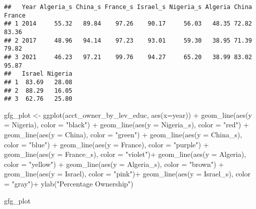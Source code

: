 \documentclass[
]{article}
\newenvironment{Shaded}{\begin{snugshade}}{\end{snugshade}}
\newcommand{\AttributeTok}[1]{\textcolor[rgb]{0.77,0.63,0.00}{#1}}
\newcommand{\FunctionTok}[1]{\textcolor[rgb]{0.00,0.00,0.00}{#1}}
\newcommand{\NormalTok}[1]{#1}
\newcommand{\OtherTok}[1]{\textcolor[rgb]{0.56,0.35,0.01}{#1}}
\newcommand{\SpecialCharTok}[1]{\textcolor[rgb]{0.00,0.00,0.00}{#1}}
\newcommand{\StringTok}[1]{\textcolor[rgb]{0.31,0.60,0.02}{#1}}
\begin{document}
\begin{verbatim}
##   Year Algeria_s China_s France_s Israel_s Nigeria_s Algeria China France
## 1 2014     55.32   89.84    97.26    90.17     56.03   48.35 72.82  83.36
## 2 2017     48.96   94.14    97.23    93.01     59.30   38.95 71.39  79.82
## 3 2021     46.23   97.21    99.76    94.27     65.20   38.99 83.02  95.87
##   Israel Nigeria
## 1  83.69   28.08
## 2  88.29   16.05
## 3  62.76   25.80
\end{verbatim}

\begin{Shaded}
\begin{Highlighting}[]
\NormalTok{gfg\_plot }\OtherTok{\textless{}{-}} \FunctionTok{ggplot}\NormalTok{(acct\_owner\_by\_lev\_educ, }\FunctionTok{aes}\NormalTok{(}\AttributeTok{x=}\NormalTok{year)) }\SpecialCharTok{+}
\FunctionTok{geom\_line}\NormalTok{(}\FunctionTok{aes}\NormalTok{(}\AttributeTok{y =}\NormalTok{ Nigeria), }\AttributeTok{color =} \StringTok{"black"}\NormalTok{) }\SpecialCharTok{+}
\FunctionTok{geom\_line}\NormalTok{(}\FunctionTok{aes}\NormalTok{(}\AttributeTok{y =}\NormalTok{ Nigeria\_s), }\AttributeTok{color =} \StringTok{"red"}\NormalTok{) }\SpecialCharTok{+}
\FunctionTok{geom\_line}\NormalTok{(}\FunctionTok{aes}\NormalTok{(}\AttributeTok{y =}\NormalTok{ China), }\AttributeTok{color =} \StringTok{"green"}\NormalTok{) }\SpecialCharTok{+}
\FunctionTok{geom\_line}\NormalTok{(}\FunctionTok{aes}\NormalTok{(}\AttributeTok{y =}\NormalTok{ China\_s), }\AttributeTok{color =} \StringTok{"blue"}\NormalTok{) }\SpecialCharTok{+}
\FunctionTok{geom\_line}\NormalTok{(}\FunctionTok{aes}\NormalTok{(}\AttributeTok{y =}\NormalTok{ France), }\AttributeTok{color =} \StringTok{"purple"}\NormalTok{) }\SpecialCharTok{+}
\FunctionTok{geom\_line}\NormalTok{(}\FunctionTok{aes}\NormalTok{(}\AttributeTok{y =}\NormalTok{ France\_s), }\AttributeTok{color =} \StringTok{"violet"}\NormalTok{)}\SpecialCharTok{+}
\FunctionTok{geom\_line}\NormalTok{(}\FunctionTok{aes}\NormalTok{(}\AttributeTok{y =}\NormalTok{ Algeria), }\AttributeTok{color =} \StringTok{"yellow"}\NormalTok{) }\SpecialCharTok{+}
\FunctionTok{geom\_line}\NormalTok{(}\FunctionTok{aes}\NormalTok{(}\AttributeTok{y =}\NormalTok{ Algeria\_s), }\AttributeTok{color =} \StringTok{"brown"}\NormalTok{) }\SpecialCharTok{+}
\FunctionTok{geom\_line}\NormalTok{(}\FunctionTok{aes}\NormalTok{(}\AttributeTok{y =}\NormalTok{ Israel), }\AttributeTok{color =} \StringTok{"pink"}\NormalTok{)}\SpecialCharTok{+}
\FunctionTok{geom\_line}\NormalTok{(}\FunctionTok{aes}\NormalTok{(}\AttributeTok{y =}\NormalTok{ Israel\_s), }\AttributeTok{color =} \StringTok{"gray"}\NormalTok{)}\SpecialCharTok{+}
  \FunctionTok{ylab}\NormalTok{(}\StringTok{"Percentage Ownership"}\NormalTok{)}

\NormalTok{gfg\_plot}
\end{Highlighting}
\end{Shaded}
\end{document}
